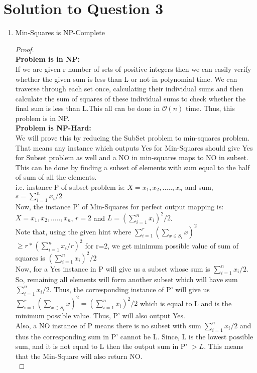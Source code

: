 \documentclass[11pt]{article}
\begin{document}
\section{Solution to Question 3}
\begin{enumerate}
    \item Min-Squares is NP-Complete
    \begin{proof}\\
  \textbf{Problem is in NP:} \\
   If we are given r number of sets of positive integers then we can easily verify whether the given sum is less than L or not in polynomial time. We can traverse through each set once, calculating their individual sums and then calculate the sum of squares of these individual sums to check whether the final sum is less than L.This all can be done in $\mathcal{O}(n)$ time.
   Thus, this problem is in NP. \\
  \textbf{Problem is NP-Hard:} \\
  We will prove this by reducing the SubSet problem to min-squares problem. That means any instance which outputs Yes for Min-Squares should give Yes for Subset problem as well and a NO in min-squares maps to NO in subset.\\
  This can be done by finding a subset of elements with sum equal to the half of sum of all the elements. \\
  i.e. instance P of subset problem is: $X={x_1, x_2, ....., x_n}$ and sum, $s = \sum_{i=1}^{n} x_i /2$ \\
  Now, the instance P' of Min-Squares for perfect output mapping is: $X={x_1, x_2, ....., x_n}$, $r=2$ and $L = (\sum_{i=1}^{n} x_i)^2 /2 $.\\
  Note that, using the given hint where $\sum_{i=1}^r (\sum_{x \in S_i} x)^2$ $\geq r*(\sum_{i=1}^n x_i/r)^2$ for r=2, we get minimum possible value of sum of squares is $(\sum_{i=1}^{n} x_i)^2 /2$\\
  Now, for a Yes instance in P will give us a subset whose sum is $\sum_{i=1}^{n} x_i/2$. So, remaining all elements will form another subset which will have sum $\sum_{i=1}^{n} x_i/2$. Thus, the corresponding instance of P' will give us $\sum_{i=1}^r (\sum_{x \in S_i} x)^2 =(\sum_{i=1}^{n} x_i)^2 /2$ which is equal to L and is the minimum possible value. Thus, P' will also output Yes. \\
  Also, a NO instance of P means there is no subset with sum $\sum_{i=1}^{n} x_i/2$ and thus the corresponding sum in P' cannot be L. Since, L is the lowest possible sum, and it is not equal to L then the output sum in P' $> L$. This means that the Min-Square will also return NO. \\

\end{proof}
\end{enumerate}
\end{document}
